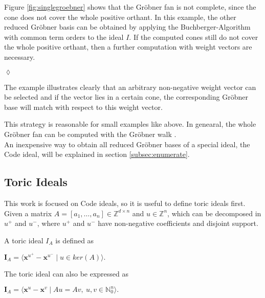 \begin{env_example}
Figure \ref{fig:singlegroebner} shows that the Gröbner fan is not complete, since the cone does not cover the whole positive orthant. In this example, the other reduced Gröbner basis can be obtained by applying the Buchberger-Algorithm with common term orders to the ideal $I$.
If the computed cones still do not cover the whole positive orthant, then a further computation with weight vectors are necessary.
\begin{flushright}
$\lozenge$
\end{flushright} 
\end{env_example}

The example illustrates clearly that an arbitrary non-negative weight vector can be selected and if the vector lies in a certain cone, the corresponding Gröbner base will match with respect to this weight vector.  


This strategy is reasonable for small examples like above.
In genearal, the whole Gröbner fan can be computed with the Gröbner walk \cite{coxOshea}.\\
An inexpensive way to obtain all reduced Gröbner bases of a special ideal, the Code ideal, will be explained in section \ref{subsec:enumerate}.

\newpage
\subsection{Toric Ideals}
\label{subsec:toric}
This work is focused on Code ideals, so it is useful to define toric ideals first. Given a matrix $A =\left[a_{1},\dots, a_{n}  \right] \in \mathbb{Z}^{d \times n } $ and $u \in \mathbb{Z}^{n}$, which can be decomposed in $u^{+} $ and $u^{-}$, where $u^{+} $ and $u^{-}$ have non-negative coefficients and disjoint support.

\begin{env_definition}
\cite{dueckjournal} A toric ideal $I_{A}$ is defined as
\begin{center}
$ \textbf{I}_{A} = \langle \textbf{x}^{u^{+}} - \textbf{x}^{u^{-}} \mid u \in ker \left(  A \right) \rangle . $
\end{center}


\end{env_definition}

The toric ideal can also be expressed as
\begin{center}
$ \textbf{I}_{A} =  \langle \textbf{x}^{u} - \textbf{x}^{v} \mid Au = Av,~ u,v \in \mathbb{N}^{n}_{0} \rangle .$
\end{center}

\newpage



